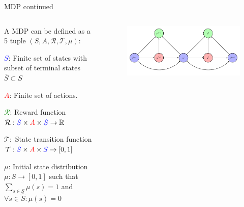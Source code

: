 \begin{frame}{MDP continued}

  \begin{columns} %

    \begin{column}{0.5\textwidth}
     A MDP can be defined as a 5 tuple $(S, A, \mathcal{R}, \mathcal{T}, \mu):$
      \blist
        \item \textcolor{blue}{$S$}: Finite set of states with subset of terminal states $\bar{S} \subset S$
        \item \textcolor{red}{$A$}: Finite set of actions. 
        \item \textcolor{green}{$\mathcal{R}$}: Reward function $\mathcal{R}: \textcolor{blue}{S} \times \textcolor{red}{A} \times \textcolor{blue}{S} \to \mathbb{R}$
        \item $\mathcal{T}:$ State transition function $\mathcal{T}: \textcolor{blue}{S} \times \textcolor{red}{A} \times \textcolor{blue}{S} \to [0, 1]$
        \item $\mu$: Initial state distribution $\mu: S \to [0,1]$ such that $\sum_{s\in S}\mu (s) = 1$ and $\forall s \in \hat{S}: \mu (s) = 0$
      \elist
    \end{column}

    \begin{column}{0.5\textwidth}
      \begin{figure}
        \includegraphics[width=\linewidth]{images/1_mdp_diagram.pdf}
      \end{figure}
    \end{column}

  \end{columns}

\end{frame}

